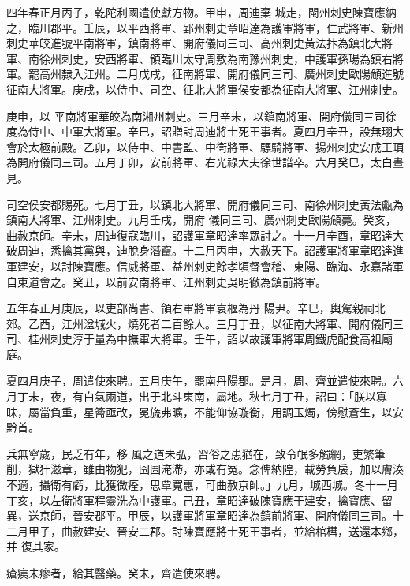 \begin{pinyinscope}
 四年春正月丙子，乾陀利國遣使獻方物。甲申，周迪棄
 城走，閩州刺史陳寶應納之，臨川郡平。壬辰，以平西將軍、郢州刺史章昭達為護軍將軍，仁武將軍、新州刺史華皎進號平南將軍，鎮南將軍、開府儀同三司、高州刺史黃法抃為鎮北大將軍、南徐州刺史，安西將軍、領臨川太守周敷為南豫州刺史，中護軍孫瑒為鎮右將軍。罷高州隸入江州。二月戊戌，征南將軍、開府儀同三司、廣州刺史歐陽頠進號征南大將軍。庚戌，以侍中、司空、征北大將軍侯安都為征南大將軍、江州刺史。



 庚申，以
 平南將軍華皎為南湘州刺史。三月辛未，以鎮南將軍、開府儀同三司徐度為侍中、中軍大將軍。辛巳，詔贈討周迪將士死王事者。夏四月辛丑，設無珝大會於太極前殿。乙卯，以侍中、中書監、中衛將軍、驃騎將軍、揚州刺史安成王頊為開府儀同三司。五月丁卯，安前將軍、右光祿大夫徐世譜卒。六月癸巳，太白晝見。



 司空侯安都賜死。七月丁丑，以鎮北大將軍、開府儀同三司、南徐州刺史黃法甗為鎮南大將軍、江州刺史。九月壬戌，開府
 儀同三司、廣州刺史歐陽頠薨。癸亥，曲赦京師。辛未，周迪復寇臨川，詔護軍章昭達率眾討之。十一月辛酉，章昭達大破周迪，悉擒其黨與，迪脫身潛竄。十二月丙申，大赦天下。詔護軍將軍章昭達進軍建安，以討陳寶應。信威將軍、益州刺史餘孝頃督會稽、東陽、臨海、永嘉諸軍自東道會之。癸丑，以前安南將軍、江州刺史吳明徹為鎮前將軍。



 五年春正月庚辰，以吏部尚書、領右軍將軍袁樞為丹
 陽尹。辛巳，輿駕親祠北郊。乙酉，江州湓城火，燒死者二百餘人。三月丁丑，以征南大將軍、開府儀同三司、桂州刺史淳于量為中撫軍大將軍。壬午，詔以故護軍將軍周鐵虎配食高祖廟庭。



 夏四月庚子，周遣使來聘。五月庚午，罷南丹陽郡。是月，周、齊並遣使來聘。六月丁未，夜，有白氣兩道，出于北斗東南，屬地。秋七月丁丑，詔曰：「朕以寡昧，屬當負重，星籥亟改，冕旒弗曠，不能仰協璇衡，用調玉燭，傍慰蒼生，以安黔首。



 兵無寧歲，民乏有年，移
 風之道未弘，習俗之患猶在，致令氓多觸網，吏繁筆削，獄犴滋章，雖由物犯，囹圄淹滯，亦或有冤。念俾納隍，載勞負扆，加以膚湊不適，攝衛有虧，比獲微痊，思覃寬惠，可曲赦京師。」九月，城西城。冬十一月丁亥，以左衛將軍程靈洗為中護軍。己丑，章昭達破陳寶應于建安，擒寶應、留異，送京師，晉安郡平。甲辰，以護軍將軍章昭達為鎮前將軍、開府儀同三司。十二月甲子，曲赦建安、晉安二郡。討陳寶應將士死王事者，並給棺槥，送還本鄉，并
 復其家。



 瘡痍未瘳者，給其醫藥。癸未，齊遣使來聘。




\end{pinyinscope}
